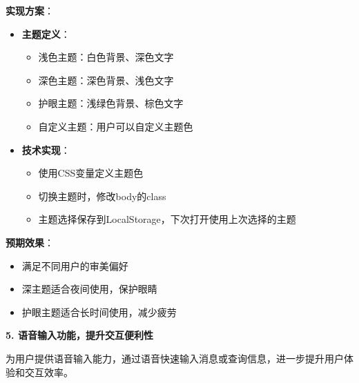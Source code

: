 \documentclass[12pt,a4paper]{article}
\begin{document}
\textbf{实现方案}：
\begin{itemize}
    \item \textbf{主题定义}：
        \begin{itemize}
            \item 浅色主题：白色背景、深色文字
            \item 深色主题：深色背景、浅色文字
            \item 护眼主题：浅绿色背景、棕色文字
            \item 自定义主题：用户可以自定义主题色
        \end{itemize}
    \item \textbf{技术实现}：
        \begin{itemize}
            \item 使用CSS变量定义主题色
            \item 切换主题时，修改body的class
            \item 主题选择保存到LocalStorage，下次打开使用上次选择的主题
        \end{itemize}
\end{itemize}

\textbf{预期效果}：
\begin{itemize}
    \item 满足不同用户的审美偏好
    \item 深主题适合夜间使用，保护眼睛
    \item 护眼主题适合长时间使用，减少疲劳
\end{itemize}

\textbf{5. 语音输入功能，提升交互便利性}

为用户提供语音输入能力，通过语音快速输入消息或查询信息，进一步提升用户体验和交互效率。
\end{document}
